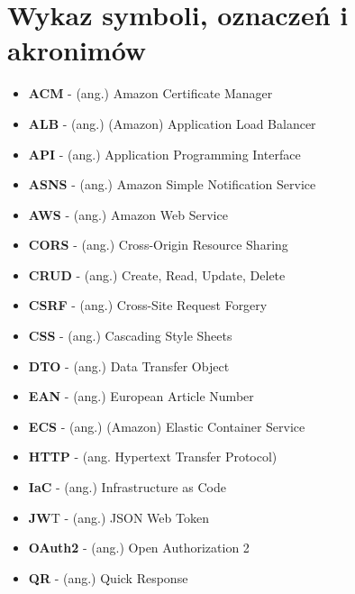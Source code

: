\documentclass[../main.tex]{subfiles}
\begin{document}
\section{Wykaz symboli, oznaczeń i akronimów}
        \begin{itemize}
            \item \textbf{ACM} - (ang.) Amazon Certificate Manager
            \item \textbf{ALB} - (ang.) (Amazon) Application Load Balancer
            \item \textbf{API} - (ang.) Application Programming Interface
            \item \textbf{ASNS} - (ang.) Amazon Simple Notification Service
            \item \textbf{AWS} - (ang.) Amazon Web Service
            \item \textbf{CORS} - (ang.) Cross-Origin Resource Sharing
            \item \textbf{CRUD} - (ang.) Create, Read, Update, Delete
            \item \textbf{CSRF} - (ang.) Cross-Site Request Forgery
            \item \textbf{CSS} - (ang.) Cascading Style Sheets
            \item \textbf{DTO} - (ang.) Data Transfer Object
            \item \textbf{EAN} - (ang.) European Article Number
            \item \textbf{ECS} - (ang.) (Amazon) Elastic Container Service
            \item \textbf{HTTP} - (ang. Hypertext Transfer Protocol)
            \item \textbf{IaC} - (ang.) Infrastructure as Code 
            \item \textbf{JW}T - (ang.) JSON Web Token
            \item \textbf{OAuth2} - (ang.) Open Authorization 2
            \item \textbf{QR} - (ang.) Quick Response

\end{itemize}
\end{document}
